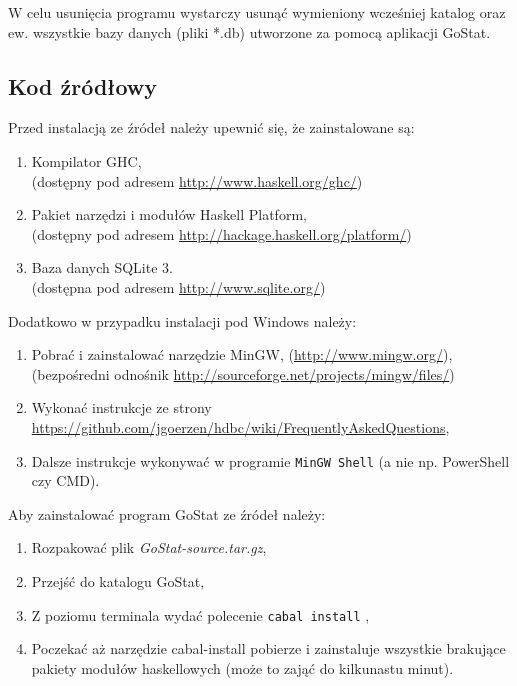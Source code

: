 \documentclass[10pt,leqno]{article}
\newcommand{\cmd}[1]{
  \texttt{#1}
}
\begin{document}
W celu usunięcia programu wystarczy usunąć wymieniony wcześniej katalog oraz ew. wszystkie bazy danych (pliki *.db) utworzone za pomocą aplikacji
GoStat.

\subsection{Kod źródłowy}
Przed instalacją ze źródeł należy upewnić się, że zainstalowane są:

\begin{enumerate}
\item Kompilator GHC, \\ (dostępny pod adresem  \url{http://www.haskell.org/ghc/})
\item Pakiet narzędzi i modułów Haskell Platform, \\ (dostępny pod adresem \url{http://hackage.haskell.org/platform/})
\item Baza danych SQLite 3. \\ (dostępna pod adresem \url{http://www.sqlite.org/})
\end{enumerate}

\noindent Dodatkowo w przypadku instalacji pod Windows należy:

\begin{enumerate}
\item Pobrać i zainstalować narzędzie MinGW, (\url{http://www.mingw.org/}), \\ (bezpośredni odnośnik \url{http://sourceforge.net/projects/mingw/files/})
\item Wykonać instrukcje ze strony \url{https://github.com/jgoerzen/hdbc/wiki/FrequentlyAskedQuestions},
\item Dalsze instrukcje wykonywać w programie \cmd{MinGW Shell} (a nie np. PowerShell czy CMD).
\end{enumerate}


\noindent Aby zainstalować program GoStat ze źródeł należy:

\begin{enumerate}
\item Rozpakować plik \emph{GoStat-source.tar.gz},
\item Przejść do katalogu GoStat,
\item Z poziomu terminala wydać polecenie \cmd{cabal install},
\item Poczekać aż narzędzie cabal-install pobierze i zainstaluje wszystkie brakujące pakiety modułów haskellowych (może to zająć do kilkunastu minut).
\end{enumerate}
\end{document}
